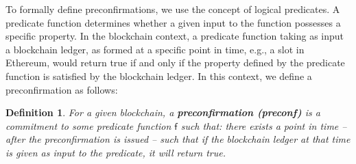 \documentclass[a4paper]{article}
\theoremstyle{boldstyle}
\newtheorem{definitionx}{Definition}
\newenvironment{definition}
  {\begin{defopenboxq}\begin{definitionx}}
  {\end{definitionx}\end{defopenboxq}}
\begin{document}
\par To formally define preconfirmations, we use the concept of logical predicates. A predicate function determines whether a given input to the function possesses a specific property. In the blockchain context, a predicate function taking as input a blockchain ledger, as formed at a specific point in time, e.g., a slot in Ethereum, would return true if and only if the property defined by the predicate function is satisfied by the blockchain ledger. In this context, we define a preconfirmation as follows:
 
    
    
    
    

        \begin{definition}
        \label{def:preconfer}
        For a given blockchain, a \textbf{preconfirmation (preconf)} is a commitment to some predicate function $\mathsf{f}$ such that: there exists a point in time -- after the preconfirmation is issued -- such that if the blockchain ledger at that time is given as input to the predicate, it will return true. 
        \end{definition}
\end{document}
